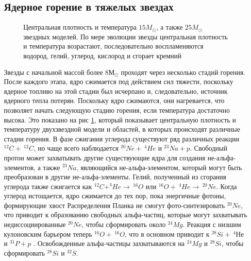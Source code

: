 \documentclass[14pt, a4paper]{article}
\numberwithin{figure}{section}
\numberwithin{equation}{section}
\begin{document}
\subsection{Ядерное горение в тяжелых звездах}

\begin{figure}[ht]
	\caption{Центральная плотность и температура $15M_\odot$, а также $25M_\odot$ звездных моделей. По мере эволюции звезды центральная плотность и температура возрастают, последовательно воспламеняются водород, гелий, углерод, кислород и сгорает кремний \cite{massive}}
	\label{ris:massive}
\end{figure}

Звезды с начальной массой более $8 М_\odot$ проходят через несколько стадий горения. После каждого этапа, ядро сжимается под действием сил тяжести, поскольку ядерное топливо на этой стадии был исчерпано и, следовательно, источник ядерного тепла потерян. Поскольку ядро сжимаются, они нагревается, что позволяет начать следующую стадию горения, если температура достаточно высока. Это показано на рис \ref{ris:massive}, который показывает центральную плотность и температуру двухзвездной модели и областей, в которых происходят различные стадии горения. В фазе сжигания углерода существуют ряд различных реакции $^{12}C + \ ^{12}C$, но чаще всего наблюдается $^{20}Ne + \ ^{4}He$ и $^{23}Na + p$. Свободный протон может захватывать другие существующие ядра для создания не-альфа-элементов, а также $^{23}Na$, являющийся не-альфа-элементом, который могут быть преобразован в другие не-альфа-элементы. Гелий, полученный из сгорания углерода также сжигается как $^{12}C + ^{4}He \rightarrow \ ^{16}O$ или $^{16}O + \ ^{4}He \rightarrow \ ^{20}Ne$. Когда углерод истощается, ядро сжимается до тех пор, пока энергичные фотоны, формирующие хвост Распределения Планка не смогут фото-синтезировать $^{20}Ne$, что приводит к образованию свободных альфа-частиц, которые могут захватывать недиссоциированные $^{20}Ne$, чтобы сформировать около $^{24}Mg$. Реакция с низшим кулоновским барьером теперь $^{16}O + \ ^{16}O$, что в основном приводит к $^{28}Si + \ ^4Не$ и $^{31}P + p$ \cite{cauldrons}. Освобожденные альфа-частицы захватываются на $^{24}Mg$ и $^{28}Si$, чтобы сформировать $^{28}Si$ и $^{32}S$.
\end{document}

